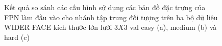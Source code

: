 {    \begin{figure}[H]
        \centering
        \caption{Kết quả so sánh các cấu hình sử dụng các bản đồ đặc trưng của FPN làm đầu vào cho nhánh tập trung đối tượng trên ba bộ dữ liệu WIDER FACE kích thước lớn lưới $3 X 3$ val easy (a), medium (b) và hard (c)}
        \label{fig:retinafocus_widerface_4k_val_fpn}
    \end{figure}

}
